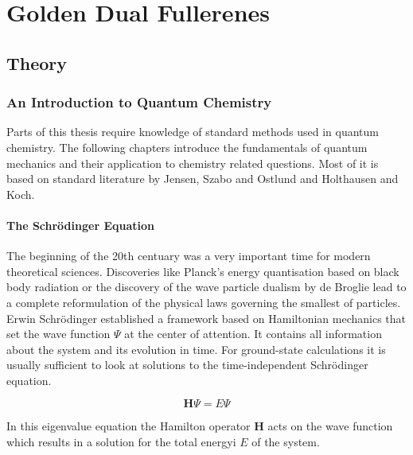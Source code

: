 
\part{Golden Dual Fullerenes}
\label{sec:goldendualfullerenes}


\chapter{Theory}
\label{sec:theorygold}

\section{An Introduction to Quantum Chemistry}
\label{sec:introtoQC}

Parts of this thesis require knowledge of standard methods used in quantum
chemistry. The following chapters introduce the fundamentals of quantum
mechanics and their application to chemistry related questions. Most of it is
based on standard literature by Jensen\autocite{jensen_introduction_2006},
Szabo and Ostlund\autocite{szabo_modern_1996} and Holthausen and
Koch\autocite{koch_chemists_2001}.

\subsection{The Schr\"odinger Equation}
\label{sec:schrodingerequation}

The beginning of the 20th centuary was a very important time for modern
theoretical sciences. Discoveries like Planck's energy quantisation based on
black body radiation or the discovery of the wave particle dualism by de
Broglie lead to a complete reformulation of the physical laws governing the
smallest of particles. Erwin Schr\"odinger established a framework based on
Hamiltonian mechanics that set the wave function $\Psi$ at the center of
attention. It contains all information about the system and its evolution in
time. For ground-state calculations it is usually sufficient to look at
solutions to the time-independent Schr\"odinger equation.

\begin{equation}
	\mathbf{H}\Psi=E\Psi\label{eqn:SchrodingerEquation}
\end{equation}

In this eigenvalue equation the Hamilton operator $\mathbf{H}$ acts on the wave
function which results in a solution for the total energyi $E$ of the system. 

